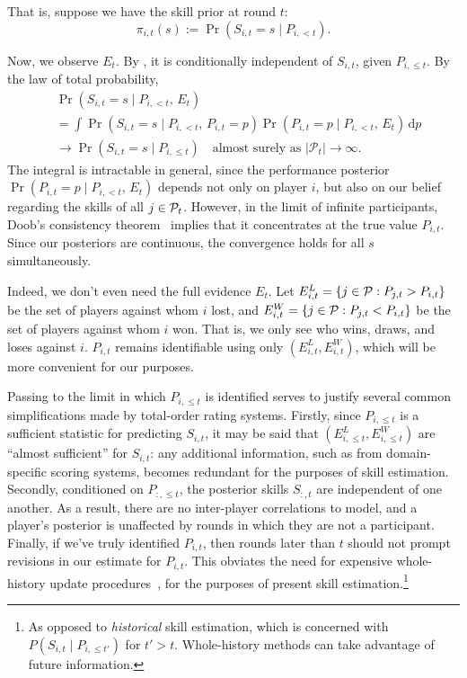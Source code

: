 That is, suppose we have the skill prior at round $t$:
\begin{equation}
\label{eq:pi-s}
\pi_{i,t}(s) := \Pr(S_{i,t} = s \mid P_{i,<t}).
\end{equation}

Now, we observe $E_t$. By , it is conditionally independent of $S_{i,t}$, given $P_{i,\le t}$. By the law of total probability,
\begin{align*}
&\Pr(S_{i,t}=s \mid P_{i,<t},\,E_t)
\\&= \int \Pr(S_{i,t}=s \mid P_{i,<t},\,P_{i,t}=p) \Pr(P_{i,t}=p \mid P_{i,<t},\,E_t) \, \mathrm{d}p
\\&\rightarrow \Pr(S_{i,t}=s \mid P_{i,\le t}) \quad\text{almost surely as }|\mathcal P_t|\rightarrow\infty.
\end{align*}
The integral is intractable in general, since the performance posterior $\Pr(P_{i,t}=p \mid P_{i,<t},\,E_t)$ depends not only on player $i$, but also on our belief regarding the skills of all $j\in\mathcal{P}_t$. However, in the limit of infinite participants, Doob's consistency theorem~\cite{F63} implies that it concentrates at the true value $P_{i,t}$. Since our posteriors are continuous, the convergence holds for all $s$ simultaneously.

Indeed, we don't even need the full evidence $E_t$. Let $E^L_{i,t} = \{j\in\mathcal{P}:P_{j,t}>P_{i,t}\}$ be the set of players against whom $i$ lost, and $E^W_{i,t} = \{j\in\mathcal{P}:P_{j,t}<P_{i,t}\}$ be the set of players against whom $i$ won. That is, we only see who wins, draws, and loses against $i$. $P_{i,t}$ remains identifiable using only $(E^L_{i,t}, E^W_{i,t})$, which will be more convenient for our purposes.

Passing to the limit in which $P_{i,\le t}$ is identified serves to justify several common simplifications made by total-order rating systems. Firstly, since $P_{i,\le t}$ is a sufficient statistic for predicting $S_{i,t}$, it may be said that $(E^L_{i,\le t}, E^W_{i,\le t})$ are ``almost sufficient'' for $S_{i,t}$: any additional information, such as from domain-specific scoring systems, becomes redundant for the purposes of skill estimation. Secondly, conditioned on $P_{:,\le t}$, the posterior skills $S_{:,t}$ are independent of one another. As a result, there are no inter-player correlations to model, and a player's posterior is unaffected by rounds in which they are not a participant. Finally, if we've truly identified $P_{i,t}$, then rounds later than $t$ should not prompt revisions in our estimate for $P_{i,t}$. This obviates the need for expensive whole-history update procedures~\cite{DHMG07,WHR}, for the purposes of present skill estimation.\footnote{As opposed to \emph{historical} skill estimation, which is concerned with $P(S_{i,t} \mid P_{i,\le t'})$ for $t'>t$. Whole-history methods can take advantage of future information.}

